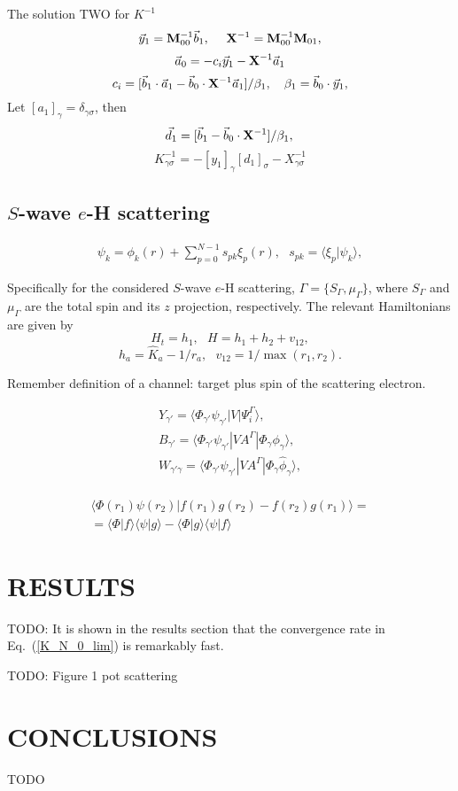 \documentclass[aip
, pra
, showpacs
, aps
, twocolumn
, groupedaddress
, floatfix
]{revtex4}
\newcommand{\beq}{\begin{equation}}
\newcommand{\eeq}{\end{equation}}
\newcommand{\barr}{\begin{array}}
\newcommand{\earr}{\end{array}}
\begin{document}
The solution TWO for $K^{-1}$
\beq
\vec{y}_1 = {\bf M}_{00}^{-1} \vec{b}_1, \ \ \ \
{\bf X}^{-1} = {\bf M}_{00}^{-1} {\bf M}_{01},
\eeq
\beq
\vec{a}_0= - c_i \vec{y}_1   - {\bf X}^{-1} \vec{a}_1
\eeq
\beq
c_i = [ \vec{b}_1 \cdot \vec{a}_1
- \vec{b}_0 \cdot {\bf X}^{-1} \vec{a}_1 ]  / \beta_1 ,\ \ \
\beta_1 = \vec{b}_0 \cdot  \vec{y}_1,
\eeq
Let $[a_1]_\gamma = \delta_{\gamma \sigma}$, then
\beq
\vec{d}_1 = [ \vec{b}_1
- \vec{b}_0 \cdot {\bf X}^{-1} ]  / \beta_1 ,\\
\eeq
\beq
K_{\gamma \sigma}^{-1}= - [y_1]_\gamma [d_1]_\sigma   - X_{\gamma \sigma}^{-1}
\eeq



\subsection{$S$-wave $e$-H scattering}

\beq \barr{l}
\psi_k = \phi_k(r) +  \sum_{p=0}^{N-1} s_{pk} \xi_p(r), \ \ \ s_{pk} = \langle \xi_p | \psi_k \rangle,
\earr \label{Psi_} \eeq


Specifically for the considered $S$-wave $e$-H scattering,
$\Gamma=\{S_\Gamma,\mu_\Gamma\}$, where $S_\Gamma$ and $\mu_\Gamma$ are the total spin and its $z$ projection, respectively.
The relevant Hamiltonians are given by
\beq
H_t = h_1, \ \ \ H = h_1 + h_2 + v_{12},
\label{H_t} \eeq
\beq
h_a = \hat{K}_a  - 1/r_a,\ \ \ v_{12} = 1/\max{(r_{1}, r_{2})}.
\label{h_b} \eeq


Remember definition of a channel: target plus spin of the scattering electron.


\beq \barr{l}
Y_{\gamma'} = \langle \Phi_{\gamma'}  \psi_{\gamma'} |V|\Psi_i^{\Gamma} \rangle,\\
B_{\gamma'} = \langle  \Phi_{\gamma'}  \psi_{\gamma'} |VA^{\Gamma} |\Phi_{\gamma} \phi_{\gamma} \rangle,\\
W_{\gamma' \gamma} = \langle \Phi_{\gamma'}  \psi_{\gamma'} |V A^{\Gamma} |\Phi_{\gamma} \widehat{\phi}_{\gamma} \rangle,\\
\earr \label{Psi_} \eeq

\beq \barr{l}
\langle  \Phi(r_1) \psi(r_2) |f(r_1) g(r_2) - f(r_2) g(r_1) \rangle = \\
=\langle  \Phi |f \rangle  \langle  \psi |g \rangle -
\langle  \Phi |g \rangle  \langle  \psi |f \rangle
\earr \eeq


\section{RESULTS}
TODO: It is shown in the results section that the convergence rate in Eq.~(\ref{K_N_0_lim}) is remarkably fast.

TODO: Figure 1 pot scattering

\section{CONCLUSIONS}
TODO


\begin{acknowledgments}
\end{acknowledgments}





%
\end{document}
